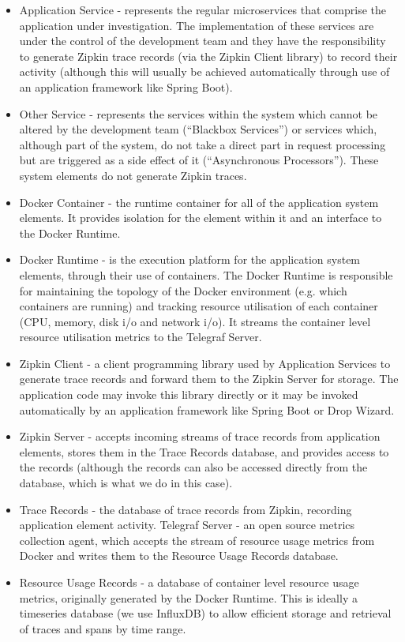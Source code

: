 \begin{itemize}
\item Application Service - represents the regular microservices that comprise the application under investigation.  The implementation of these services are under the control of the development team and they have the responsibility to generate Zipkin trace records (via the Zipkin Client library) to record their activity (although this will usually be achieved automatically through use of an application framework like Spring Boot).
\item Other Service - represents the services within the system which cannot be altered by the development team (“Blackbox Services”) or services which, although part of the system, do not take a direct part in request processing but are triggered as a side effect of it (“Asynchronous Processors”).  These system elements do not generate Zipkin traces.
\item Docker Container - the runtime container for all of the application system elements.   It provides isolation for the element within it and an interface to the Docker Runtime.
\item Docker Runtime - is the execution platform for the application system elements, through their use of containers.  The Docker Runtime is responsible for maintaining the topology of the Docker environment (e.g. which containers are running) and tracking resource utilisation of each container (CPU, memory, disk i/o and network i/o).  It streams the container level resource utilisation metrics to the Telegraf Server.
\item Zipkin Client - a client programming library used by Application Services to generate trace records and forward them to the Zipkin Server for storage.  The application code may invoke this library directly or it may be invoked automatically by an application framework like Spring Boot or Drop Wizard.
\item Zipkin Server - accepts incoming streams of trace records from application elements, stores them in the Trace Records database, and provides access to the records (although the records can also be accessed directly from the database, which is what we do in this case).
\item Trace Records - the database of trace records from Zipkin, recording application element activity.
Telegraf Server - an open source metrics collection agent, which accepts the stream of resource usage metrics from Docker and writes them to the Resource Usage Records database.
\item Resource Usage Records - a database of container level resource usage metrics, originally generated by the Docker Runtime.  This is ideally a timeseries database (we use InfluxDB) to allow efficient storage and retrieval of traces and spans by time range.

\end{itemize}
